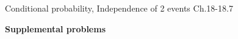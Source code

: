 \documentclass[handout]{mcs}
\begin{document}
\begin{staffnotes}
Conditional probability, Independence of 2 events Ch.18-18.7
\end{staffnotes}






\begin{center}
\textbf{\large Supplemental problems}
\end{center}




\end{document}
